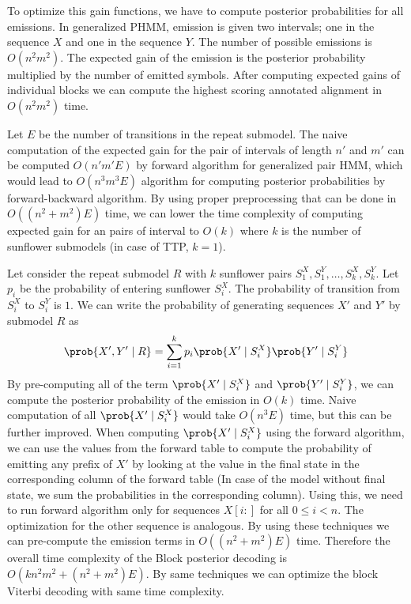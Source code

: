 To optimize this gain functions, we have to compute posterior probabilities for
all emissions. In generalized PHMM, emission is given two intervals; one in the
sequence $X$ and one in the sequence $Y$. The number of possible emissions is
$O(n^2m^2)$. The expected gain of the emission is the posterior probability
multiplied by the number of emitted symbols. After computing expected gains of
individual blocks we can compute the highest scoring annotated alignment in
$O(n^2m^2)$ time.

Let $E$ be the number of transitions in the repeat submodel. The naive
computation of the expected gain for the pair of intervals of length $n'$ and
$m'$ can be computed $O(n'm'E)$ by forward algorithm for generalized pair HMM,
which would lead to $O(n^3m^3E)$ algorithm for computing posterior
probabilities by forward-backward algorithm. By using proper preprocessing that
can be done in $O((n^2+m^2)E)$ time, we can lower the time complexity of
computing expected gain for an pairs of interval to $O(k)$ where $k$ is the
number of sunflower submodels (in case of TTP, $k=1$).

Let consider the repeat submodel $R$ with $k$ sunflower pairs $S^X_1, S^Y_1,
\dots, S^X_k, S^Y_k$. Let $p_i$ be the probability of entering sunflower
$S^X_i$.  The probability of transition from $S^X_i$ to $S^Y_i$ is $1$. We can
write the probability of generating sequences $X'$ and $Y'$ by submodel $R$ as
\begin{equation}
\prob{X', Y'\mid R} = \sum_{i=1}^k p_i\prob{X'\mid S^X_i}\prob{Y'\mid S^Y_i}
\end{equation}
By pre-computing all of the term $\prob{X'\mid S^X_i}$ and $\prob{Y'\mid
S^Y_i}$, we can compute the posterior probability of the emission in $O(k)$
time. Naive computation of all $\prob{X'\mid S^X_i}$ would take $O(n^3E)$ time,
but this can be further improved. When computing $\prob{X'\mid S^X_i}$ using
the forward algorithm, we can use the values from the forward table to compute
the probability of emitting any prefix of $X'$ by looking at the value in the
final state in the corresponding column of the forward table (In case of the
model without final state, we sum the probabilities in the corresponding
column). Using this, we need to run forward algorithm only for sequences
$X[i:]$ for all $0\leq i< n$. The optimization for the other sequence is
analogous. By using these techniques we can pre-compute the emission terms in
$O((n^2+m^2)E)$ time. Therefore the overall time complexity of the Block
posterior decoding is $O(kn^2m^2 + (n^2+m^2)E)$. By same techniques we
can optimize the block Viterbi decoding with same time complexity.

